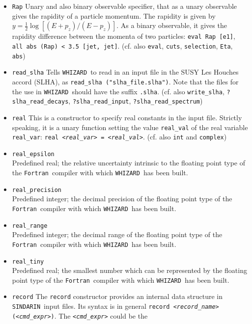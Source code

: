 \documentclass[12pt]{book}
\newcommand{\ttt}[1]{\texttt{#1}}
\newcommand{\whizard}{\ttt{WHIZARD}}
\newcommand{\sindarin}{\ttt{SINDARIN}}
\newcommand{\fortran}{\ttt{Fortran}}
\begin{document}
\begin{itemize}
\item
\ttt{Rap} \newline
Unary and also binary observable specifier, that as a unary observable
gives the rapidity of a particle momentum. The rapidity is given by $y
= \frac12 \log \left[ (E + p_z)/(E-p_z) \right]$. As a binary
observable, it gives the rapidity difference between the momenta of
two particles: \ttt{eval Rap [e1]},  \ttt{all abs (Rap) < 3.5 [jet,
  jet]}. (cf. also \ttt{eval}, \ttt{cuts}, \ttt{selection}, \ttt{Eta},
\ttt{abs})
\item
\ttt{read\_slha} \newline
Tells \whizard\ to read in an input file in the SUSY Les Houches accord
(SLHA), as \ttt{read\_slha ("slha\_file.slha")}. Note that the files
for the use in \whizard\ should have the suffix \ttt{.slha}.
(cf. also \ttt{write\_slha}, \ttt{?slha\_read\_decays},
\ttt{?slha\_read\_input}, \ttt{?slha\_read\_spectrum})
\item
\ttt{real} \newline
This is a constructor to specify real constants in the input
file. Strictly speaking, it is a unary function setting the value
\ttt{real\_val} of the real variable \ttt{real\_var}:
\ttt{real {\em <real\_var>} = {\em <real\_val>}}. (cf. also \ttt{int} and
\ttt{complex})
\item
\ttt{real\_epsilon}\\
Predefined real; the relative uncertainty intrinsic to the floating
point type of the \fortran\ compiler with which \whizard\ has been
built.
\item
\ttt{real\_precision}\\
Predefined integer; the decimal precision of the floating point type
of the \fortran\ compiler with which \whizard\ has been built.
\item
\ttt{real\_range}\\
Predefined integer; the decimal range of the floating point type of
the \fortran\ compiler with which \whizard\ has been built.
\item
\ttt{real\_tiny}\\
Predefined real; the smallest number which can be represented by the
floating point type of the \fortran\ compiler with which \whizard\ has
been built.
\item
\ttt{record} \newline
The \ttt{record} constructor provides an internal data structure in
\sindarin\ input files. Its syntax is in general \ttt{record
  {\em <record\_name>} ({\em <cmd\_expr>})}. The \ttt{{\em <cmd\_expr>}} could be the

\end{itemize}
\end{document}
